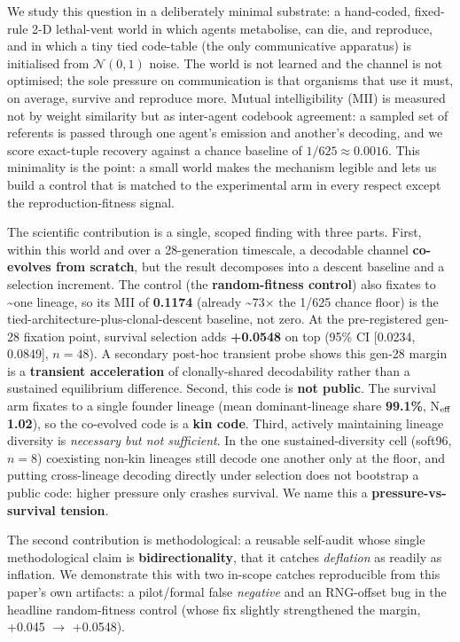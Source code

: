 \documentclass[12pt,letterpaper]{article}
\begin{document}
We study this question in a deliberately minimal substrate: a hand-coded, fixed-rule 2-D
lethal-vent world in which agents metabolise, can die, and reproduce, and in which a tiny
tied code-table (the only communicative apparatus) is initialised from $\mathcal{N}(0,1)$
noise. The world is not learned and the channel is not optimised; the sole pressure on
communication is that organisms that use it must, on average, survive and reproduce more.
Mutual intelligibility (MII) is measured not by weight similarity but as inter-agent
codebook agreement: a sampled set of referents is passed through one agent's emission and
another's decoding, and we score exact-tuple recovery against a chance baseline of
$1/625 \approx 0.0016$. This minimality is the point: a small world makes the mechanism
legible and lets us build a control that is matched to the experimental arm in every respect
except the reproduction-fitness signal.

The scientific contribution is a single, scoped finding with three parts. First, within this
world and over a 28-generation timescale, a decodable channel \textbf{co-evolves from
scratch}, but the result decomposes into a descent baseline and a selection increment. The
control (the \textbf{random-fitness control}) also fixates to \textasciitilde{}one lineage,
so its MII of \textbf{0.1174} (already \textasciitilde{}73$\times$ the 1/625 chance floor)
is the tied-architecture-plus-clonal-descent baseline, not zero. At the pre-registered
gen-28 fixation point, survival selection adds \textbf{+0.0548} on top (95\% CI
[0.0234, 0.0849], $n{=}48$). A secondary post-hoc transient probe shows this gen-28 margin
is a \textbf{transient acceleration} of clonally-shared decodability rather than a sustained
equilibrium difference. Second, this code is \textbf{not public}. The survival arm fixates
to a single founder lineage (mean dominant-lineage share \textbf{99.1\%}, N$_{\rm eff}$
\textbf{1.02}), so the co-evolved code is a \textbf{kin code}. Third, actively maintaining
lineage diversity is \emph{necessary but not sufficient}. In the one sustained-diversity
cell (soft96, $n{=}8$) coexisting non-kin lineages still decode one another only at the
floor, and putting cross-lineage decoding directly under selection does not bootstrap a
public code: higher pressure only crashes survival. We name this a
\textbf{pressure-vs-survival tension}.

The second contribution is methodological: a reusable self-audit whose single
methodological claim is \textbf{bidirectionality}, that it catches \emph{deflation} as
readily as inflation. We demonstrate this with two in-scope catches reproducible from this paper's
own artifacts: a pilot/formal false \emph{negative} and an RNG-offset bug in the headline
random-fitness control (whose fix slightly strengthened the margin, +0.045 $\to$ +0.0548).
\end{document}
